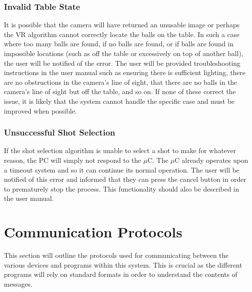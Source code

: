 \documentclass[titlepage]{article}
\begin{document}
\subsubsection{Invalid Table State}
It is possible that the camera will have returned an unusable image or perhaps the VR algorithm cannot correctly locate the balls on the table. In such a case where too many balls are found, if no balls are found, or if balls are found in impossible locations (such as off the table or excessively on top of another ball), the user will be notified of the error. The user will be provided troubleshooting instructions in the user manual such as ensuring there is sufficient lighting, there are no obstructions in the camera's line of sight, that there are no balls in the camera's line of sight but off the table, and so on. If none of these correct the issue, it is likely that the system cannot handle the specific case and must be improved when possible.
\subsubsection{Unsuccessful Shot Selection}
If the shot selection algorithm is unable to select a shot to make for whatever reason, the PC will simply not respond to the $\mu$C. The $\mu$C already operates upon a timeout system and so it can continue its normal operation. The user will be notified of this error and informed that they can press the cancel button in order to prematurely stop the process. This functionality should also be described in the user manual.



\section{Communication Protocols}
This section will outline the protocols used for communicating between the various devices and programs within this system. This is crucial as the different programs will rely on standard formats in order to understand the contents of messages.
\end{document}
